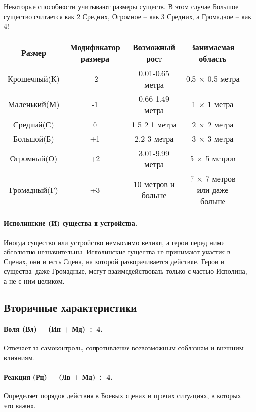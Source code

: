 Некоторые способности учитывают размеры существ. В этом случае Большое существо считается как 2 Средних, Огромное – как 3 Средних, а Громадное – как 4!
\begin{center}
    \begin{tabular}{ |c|c|c|c|c| }
        \hline
        Размер & Модификатор размера & Возможный рост & Занимаемая область
        \\ \hline
        Крошечный(К) & -2 & 0.01-0.65 метра & 0.5 × 0.5 метра
        \\ \hline
        Маленький(М) & -1 & 0.66-1.49 метра & 1 × 1 метра
        \\ \hline
        Средний(С) & 0 & 1.5-2.1 метра & 2 × 2 метра
        \\ \hline
        Большой(Б) & +1 & 2.2-3 метра & 3 × 3 метра
        \\ \hline
        Огромный(О) & +2 & 3.01-9.99 метра & 5 × 5 метров
        \\ \hline
        Громадный(Г) & +3 & 10 метров и больше & 7 × 7 метров или даже больше
        \\ \hline
    \end{tabular}
\end{center}
\paragraph{Исполинские (И) существа и устройства.} Иногда существо или устройство немыслимо велики, а герои перед ними абсолютно незначительны. Исполинские существа не принимают участия в Сценах, они и есть Сцена, на которой разворачивается действие. Герои и существа, даже Громадные, могут взаимодействовать только с частью Исполина, а не с ним целиком.

\subsection{Вторичные характеристики}
\paragraph{Воля (Вл) = (Ин + Мд) ÷ 4.} Отвечает за самоконтроль, сопротивление всевозможным соблазнам и внешним влияниям.

\paragraph{Реакция (Рц) = (Лв + Мд) ÷ 4.} Определяет порядок действия в Боевых сценах и прочих ситуациях, в которых это важно.


